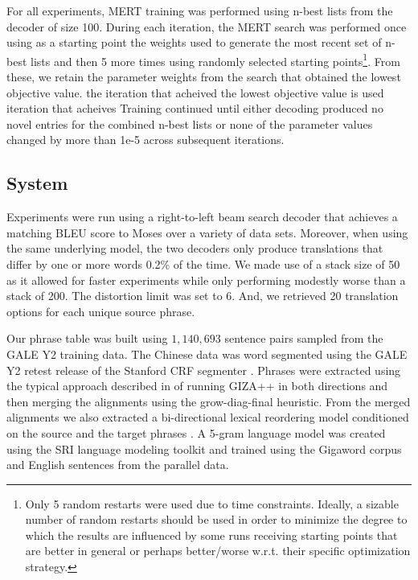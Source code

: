 \documentclass[11pt,tightenlines,kern-1pt]{article}
\begin{document}
For all experiments, MERT training was performed using n-best lists from the decoder of size 100. During each iteration, the MERT search was performed once using as a starting point the weights used to generate the most recent set of n-best lists and then 5 more times using randomly selected starting points\footnote{Only 5 random restarts were used due to time constraints. Ideally, a sizable number of random restarts should be used in order to minimize the degree to which the results are influenced by some runs receiving starting points that are better in general or perhaps better/worse w.r.t\@. their specific optimization strategy.}. From these, we retain the parameter weights from the search that obtained the lowest objective value. the iteration that acheived the lowest objective value is used iteration that acheives  Training continued until either decoding produced no novel entries for the combined n-best lists or none of the parameter values changed by more than 1e-5 across subsequent iterations. 

\subsection{System}

Experiments were run using a right-to-left beam search decoder that achieves a matching BLEU score to Moses \cite{koehn2007} over a variety of data sets. Moreover, when using the same underlying model, the two decoders only produce translations that differ by one or more words 0.2\% of the time. We made use of a stack size of 50 as it allowed for faster experiments while only performing modestly worse than a stack of 200. The distortion limit was set to 6. And, we retrieved 20 translation options for each unique source phrase.

Our phrase table was built using \mbox{$1,140,693$} sentence pairs sampled from the GALE Y2 training data.  The Chinese data was word segmented using the GALE Y2 retest release of the Stanford CRF segmenter \cite{tseng05}.  Phrases were extracted using the typical approach described in  of running GIZA++ \cite{och03} in both directions and then merging the alignments using the grow-diag-final heuristic. From the merged alignments we also extracted a bi-directional lexical reordering model conditioned on the source and the target phrases \cite{tillmann04} \cite{koehn2007}. A 5-gram language model was created using the SRI language modeling toolkit \cite{stolcke02srilm} and trained using the Gigaword corpus and English sentences from the parallel data. 
\end{document}
